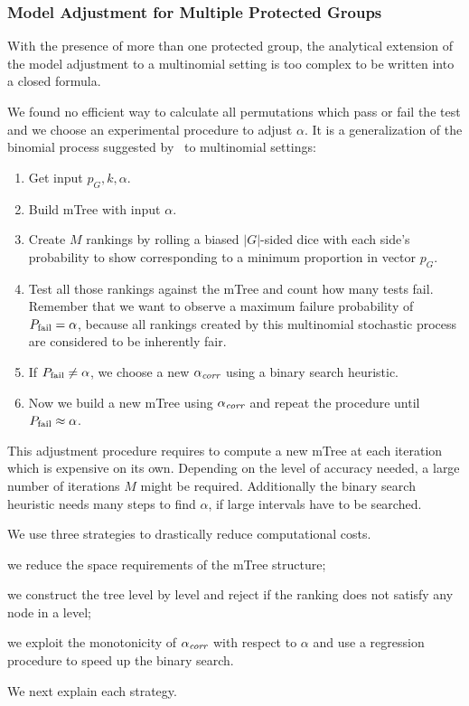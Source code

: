 \subsubsection{Model Adjustment for Multiple Protected Groups}
\label{sec:multinomial-adjustment}
%
With the presence of more than one protected group, the analytical extension of the model adjustment to a multinomial setting is too complex to be written into a closed formula.

We found no efficient way to calculate all permutations which pass or fail the test and we choose an experimental procedure to adjust $ \alpha $.
%
It is a generalization of the binomial process suggested by~\citet{yang2016measuring} to multinomial settings:
\begin{enumerate}
	\item Get input $ p_G, k, \alpha $.
	\item Build mTree with input $ \alpha $.
	\item Create $M$ rankings by rolling a biased $ |G| $-sided dice with each side's probability to show corresponding to a minimum proportion in vector $ p_G $.
	\item Test all those rankings against the mTree and count how many tests fail.
	Remember that we want to observe a maximum failure probability of $ P_{\operatorname{fail}}=\alpha $, because all rankings created by this multinomial stochastic process are considered to be inherently fair.
	\item If $ P_{\operatorname{fail}} \neq \alpha $, we choose a new $ \alpha_\textit{corr} $ using a binary search heuristic.
	\item Now we build a new mTree using $ \alpha_\textit{corr} $ and repeat the procedure until $ P_{\operatorname{fail}} \approx \alpha $.
\end{enumerate}
%
This adjustment procedure requires to compute a new mTree at each iteration which is expensive on its own. Depending on the level of accuracy needed, a large number of iterations $M$ might be required.
%
Additionally the binary search heuristic needs many steps to find $\alpha$, if large intervals have to be searched.

We use three strategies to drastically reduce computational costs.
%
\begin{inparaenum}[(1)]
%
\item we reduce the space requirements of the mTree structure;
%
\item we construct the tree level by level and reject if the ranking does not satisfy any node in a level;
%
\item we exploit the monotonicity of $\alpha_\textit{corr}$ with respect to $\alpha$ and use a regression procedure to speed up the binary search.
\end{inparaenum}
%
We next explain each strategy.


